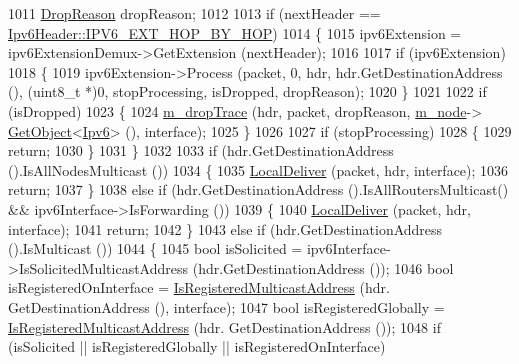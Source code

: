\begin{DoxyCode}
1011   \hyperlink{classns3_1_1Ipv6L3Protocol_a33c64db9bc35f71ff368b132bfffa37a}{DropReason} dropReason;
1012 
1013   \textcolor{keywordflow}{if} (nextHeader == \hyperlink{classns3_1_1Ipv6Header_a226429221a066c5e3b1f260caf27d1e9aa0413202f88bebb4f91a138e317b6bbd}{Ipv6Header::IPV6\_EXT\_HOP\_BY\_HOP})
1014     \{
1015       ipv6Extension = ipv6ExtensionDemux->GetExtension (nextHeader);
1016 
1017       \textcolor{keywordflow}{if} (ipv6Extension)
1018         \{
1019           ipv6Extension->Process (packet, 0, hdr, hdr.GetDestinationAddress (), (uint8\_t *)0, 
      stopProcessing, isDropped, dropReason);
1020         \}
1021 
1022       \textcolor{keywordflow}{if} (isDropped)
1023         \{
1024           \hyperlink{classns3_1_1Ipv6L3Protocol_ac22d2d63cac436267ae6cafc46880a6e}{m\_dropTrace} (hdr, packet, dropReason, \hyperlink{classns3_1_1Ipv6L3Protocol_a543d8509395ee76de15d039ff1fce642}{m\_node}->
      \hyperlink{classns3_1_1Object_a13e18c00017096c8381eb651d5bd0783}{GetObject}<\hyperlink{classns3_1_1Ipv6_adccc58acd14d3f9a28f75dc09e794998}{Ipv6}> (), interface);
1025         \}
1026 
1027       \textcolor{keywordflow}{if} (stopProcessing)
1028         \{
1029           \textcolor{keywordflow}{return};
1030         \}
1031     \}
1032 
1033   \textcolor{keywordflow}{if} (hdr.GetDestinationAddress ().IsAllNodesMulticast ())
1034     \{
1035       \hyperlink{classns3_1_1Ipv6L3Protocol_a8e2c7a80851d870812295c19dc908a38}{LocalDeliver} (packet, hdr, interface);
1036       \textcolor{keywordflow}{return};
1037     \}
1038   \textcolor{keywordflow}{else} \textcolor{keywordflow}{if} (hdr.GetDestinationAddress ().IsAllRoutersMulticast() && ipv6Interface->IsForwarding ())
1039     \{
1040       \hyperlink{classns3_1_1Ipv6L3Protocol_a8e2c7a80851d870812295c19dc908a38}{LocalDeliver} (packet, hdr, interface);
1041       \textcolor{keywordflow}{return};
1042     \}
1043   \textcolor{keywordflow}{else} \textcolor{keywordflow}{if} (hdr.GetDestinationAddress ().IsMulticast ())
1044     \{
1045       \textcolor{keywordtype}{bool} isSolicited = ipv6Interface->IsSolicitedMulticastAddress (hdr.GetDestinationAddress ());
1046       \textcolor{keywordtype}{bool} isRegisteredOnInterface = \hyperlink{classns3_1_1Ipv6L3Protocol_ad883e42df23aa1fc0fe38a1489830b1a}{IsRegisteredMulticastAddress} (hdr.
      GetDestinationAddress (), interface);
1047       \textcolor{keywordtype}{bool} isRegisteredGlobally = \hyperlink{classns3_1_1Ipv6L3Protocol_ad883e42df23aa1fc0fe38a1489830b1a}{IsRegisteredMulticastAddress} (hdr.
      GetDestinationAddress ());
1048       \textcolor{keywordflow}{if} (isSolicited || isRegisteredGlobally || isRegisteredOnInterface)

\end{DoxyCode}
